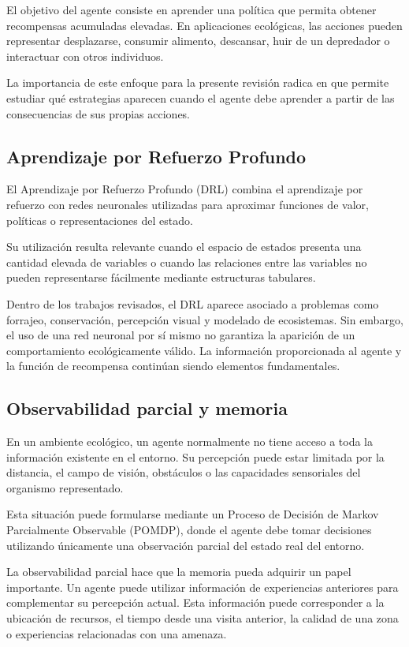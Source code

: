 \documentclass[conference]{IEEEtran}
\begin{document}
El objetivo del agente consiste en aprender una política que permita
obtener recompensas acumuladas elevadas. En aplicaciones ecológicas, las
acciones pueden representar desplazarse, consumir alimento, descansar,
huir de un depredador o interactuar con otros individuos.

La importancia de este enfoque para la presente revisión radica en que
permite estudiar qué estrategias aparecen cuando el agente debe aprender
a partir de las consecuencias de sus propias acciones.

\subsection{Aprendizaje por Refuerzo Profundo}

El Aprendizaje por Refuerzo Profundo (DRL) combina el aprendizaje por
refuerzo con redes neuronales utilizadas para aproximar funciones de
valor, políticas o representaciones del estado.

Su utilización resulta relevante cuando el espacio de estados presenta
una cantidad elevada de variables o cuando las relaciones entre las
variables no pueden representarse fácilmente mediante estructuras
tabulares.

Dentro de los trabajos revisados, el DRL aparece asociado a problemas
como forrajeo, conservación, percepción visual y modelado de ecosistemas.
Sin embargo, el uso de una red neuronal por sí mismo no garantiza la
aparición de un comportamiento ecológicamente válido. La información
proporcionada al agente y la función de recompensa continúan siendo
elementos fundamentales.

\subsection{Observabilidad parcial y memoria}

En un ambiente ecológico, un agente normalmente no tiene acceso a toda la
información existente en el entorno. Su percepción puede estar limitada
por la distancia, el campo de visión, obstáculos o las capacidades
sensoriales del organismo representado.

Esta situación puede formularse mediante un Proceso de Decisión de Markov
Parcialmente Observable (POMDP), donde el agente debe tomar decisiones
utilizando únicamente una observación parcial del estado real del
entorno.

La observabilidad parcial hace que la memoria pueda adquirir un papel
importante. Un agente puede utilizar información de experiencias
anteriores para complementar su percepción actual. Esta información puede
corresponder a la ubicación de recursos, el tiempo desde una visita
anterior, la calidad de una zona o experiencias relacionadas con una
amenaza.
\end{document}
